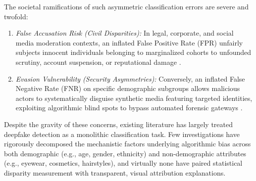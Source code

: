 \documentclass[journal]{IEEEtran}
\begin{document}
The societal ramifications of such asymmetric classification errors are severe and twofold:
\begin{enumerate}
    \item \textit{False Accusation Risk (Civil Disparities):} In legal, corporate, and social media moderation contexts, an inflated False Positive Rate (FPR) unfairly subjects innocent individuals belonging to marginalized cohorts to unfounded scrutiny, account suspension, or reputational damage \cite{raji2020saving}.
    \item \textit{Evasion Vulnerability (Security Asymmetries):} Conversely, an inflated False Negative Rate (FNR) on specific demographic subgroups allows malicious actors to systematically disguise synthetic media featuring targeted identities, exploiting algorithmic blind spots to bypass automated forensic gateways \cite{xu2024analyzing}.
\end{enumerate}

Despite the gravity of these concerns, existing literature has largely treated deepfake detection as a monolithic classification task. Few investigations have rigorously decomposed the mechanistic factors underlying algorithmic bias across both demographic (e.g., age, gender, ethnicity) and non-demographic attributes (e.g., eyewear, cosmetics, hairstyles), and virtually none have paired statistical disparity measurement with transparent, visual attribution explanations.
\end{document}
